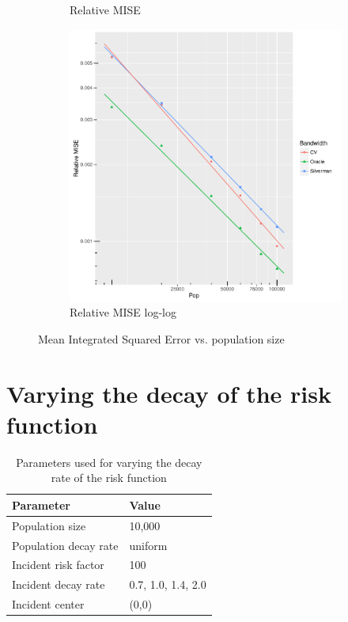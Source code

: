 \begin{figure}[htbp]
\begin{subfigure}[b]{0.3\textwidth}
    \caption{Relative MISE}
    \end{subfigure}
    \begin{subfigure}[b]{0.3\textwidth}
    \includegraphics[width=\textwidth]{results/by_pop_size/RMISE-vs-population-log-log}
    \caption{Relative MISE log-log}
    \end{subfigure}
    \caption[MISE: by population size]{Mean Integrated Squared Error vs. population size}
    \label{fig:ise:unifNpop_1h}
\end{figure}


\section{Varying the decay of the risk function}
\label{sec:results:unif_100_SD}

\begin{table}[htbp]
\centering
\begin{tabular}{ll}
\hline
Parameter & Value \\
\hline
Population size & 10,000 \\
Population decay rate & uniform \\
Incident risk factor & 100 \\
Incident decay rate & 0.7, 1.0, 1.4, 2.0 \\
Incident center & (0,0) \\
\hline
\end{tabular}
\caption{Parameters used for varying the decay rate of the risk function}
\label{tab:params:unif_100_SD}
\end{table}

